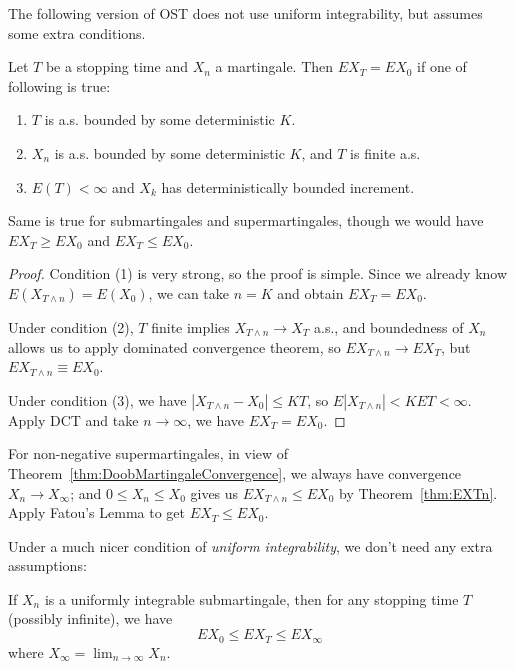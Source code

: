 The following version of OST does not use uniform integrability, but assumes some extra conditions.
\begin{theorem}
	Let $T$ be a stopping time and $X_n$ a martingale. Then $E X_T = E X_0$ if one of following is true:
	\begin{enumerate}
		\item $T$ is a.s. bounded by some deterministic $K$.
		\item $X_n$ is a.s. bounded by some deterministic $K$, and $T$ is finite a.s.
		\item $E(T) < \infty $ and $X_k$ has deterministically bounded increment.
	\end{enumerate}

	Same is true for submartingales and supermartingales, though we would have $E X_T \ge E X_0$ and $E X_T \le E X_0$.
\end{theorem}
\begin{proof}
	Condition (1) is very strong, so the proof is simple. Since we already know $E(X_{T \wedge n}) = E(X_0)$, we can take $n = K$ and obtain $EX_T = EX_0$.

	Under condition (2), $T$ finite implies $X_{T \wedge n} \to  X_T$ a.s., and boundedness of $X_n$ allows us to apply dominated convergence theorem, so $E X_{T \wedge n} \to  E X_T$, but $E X_{T \wedge n} \equiv E X_0$.

	Under condition (3), we have $|X_{T \wedge n} - X_0| \le  K T$, so $E|X_{T \wedge n}| < K ET < \infty $. Apply DCT and take $n \to \infty $, we have $E X_T = E X_0$.
\end{proof}

\begin{remark}
	For non-negative supermartingales, in view of Theorem~\ref{thm:DoobMartingaleConvergence}, we always have convergence  $X_n \to X_\infty $; and $0 \le X_n \le X_0$ gives us $E X_{T \wedge n} \le  E X_0$ by Theorem~\ref{thm:EXTn}. Apply Fatou's Lemma to get $E X_T \le  E X_0$.
\end{remark}

Under a much nicer condition of \textit{uniform integrability}, we don't need any extra assumptions:
\begin{theorem}
	\label{thm:OptionalStoppingThm}
	If $X_n$ is a uniformly integrable submartingale, then for any stopping time $T$ (possibly infinite), we have 
	\[
		E X_0 \le  E X_T \le E X_\infty
	\] 
	where $X_\infty  = \lim _{n\to \infty } X_n$.
\end{theorem}

